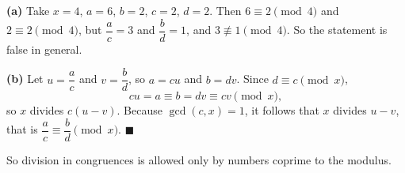\textbf{(a)} Take $x=4$, $a=6$, $b=2$, $c=2$, $d=2$. Then $6\equiv2\pmod4$ and $2\equiv2\pmod4$, but $\dfrac{a}{c}=3$ and $\dfrac{b}{d}=1$, and $3\not\equiv1\pmod4$. So the statement is false in general.

\textbf{(b)} Let $u=\dfrac{a}{c}$ and $v=\dfrac{b}{d}$, so $a=cu$ and $b=dv$. Since $d\equiv c\pmod x$,
\[
cu=a\equiv b=dv\equiv cv\pmod{x},
\]
so $x$ divides $c(u-v)$. Because $\gcd(c,x)=1$, it follows that $x$ divides $u-v$, that is $\dfrac{a}{c}\equiv\dfrac{b}{d}\pmod{x}$. $\blacksquare$

So division in congruences is allowed only by numbers coprime to the modulus.
